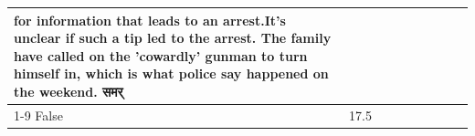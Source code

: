 \begin{table}[H]
\begin{tabular}{lllrlllll}
for information that leads to an arrest.It's unclear if such a tip led to the arrest. The family have called on the 'cowardly' gunman to turn himself in, which is what police say happened on the weekend. समर् \\
\cline{1-9}
False & 17.5%
\end{tabular}
\end{table}

